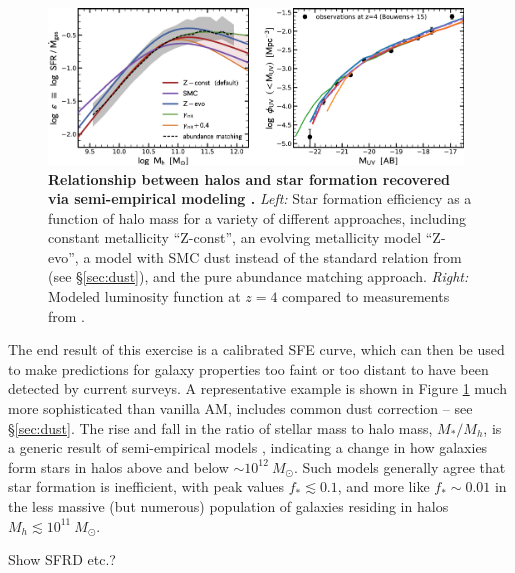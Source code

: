 \begin{figure}[]
\begin{center}
\includegraphics[width=0.98\textwidth]{Mirocha/tacchella2018_fig2.pdf}
\end{center}
\caption{{\bf Relationship between halos and star formation recovered via semi-empirical modeling \cite{Tacchella2018}.} \textit{Left:} Star formation efficiency as a function of halo mass for a variety of different approaches, including constant metallicity ``Z-const'', an evolving metallicity model ``Z-evo'', a model with SMC dust instead of the standard relation from \cite{Meurer1999} (see \S\ref{sec:dust}), and the pure abundance matching approach. \textit{Right:} Modeled luminosity function at $z=4$ compared to measurements from \cite{Bouwens2015}.}
\label{fig:sfe_lf}
\end{figure}

The end result of this exercise is a calibrated SFE curve, which can then be used to make predictions for galaxy properties too faint or too distant to have been detected by current surveys. A representative example \cite{Behroozi2019} is shown in Figure \ref{fig:sfe_lf} {\color{red} much more sophisticated than vanilla AM, includes common dust correction -- see \S\ref{sec:dust}}. The rise and fall in the ratio of stellar mass to halo mass, $M_{\ast} / M_h$, is a generic result of semi-empirical models \cite{Trenti2010,Mason2015,Sun2016,Mashian2016,Tacchella2018}, indicating a change in how galaxies form stars in halos above and below $\sim 10^{12} \ M_{\odot}$. Such models generally agree that star formation is inefficient, with peak values $f_{\ast} \lesssim 0.1$, and more like $f_{\ast} \sim 0.01$ in the less massive (but numerous) population of galaxies residing in halos $M_h \lesssim 10^{11} \ M_{\odot}$.

{\color{red} Show SFRD etc.?}

